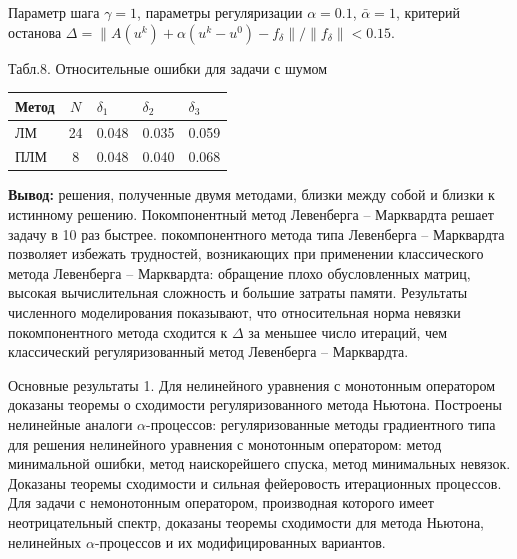 \documentclass[10pt,pdf, mathserif, hyperref={unicode}]{beamer}
\begin{document}
\begin{frame}{}
	Параметр шага $\gamma=1$, параметры регуляризации $\alpha=0.1$, $\bar{\alpha}=1$, критерий останова $\Delta=\|A(u^k)+\alpha(u^k-u^0)-f_\delta\|/\|f_\delta\|<0.15$.
	\begin{table}[H]
		\centering
		{\scriptsize Табл.8. Относительные ошибки для задачи с шумом}
		\begin{tabular}{|l|c|l|l|l|}
			\hline
			\textbf{Метод} & \textbf{$N$} & \textbf{$\delta_1$} & \textbf{$\delta_2$} & \textbf{$\delta_3$} \\ \hline
			ЛМ                                                    & 24                            & 0.048                                & 0.035                                & 0.059                                \\ \hline
			ПЛМ                                                   & 8                             & 0.048                                & 0.040                                & 0.068                                \\ \hline
		\end{tabular}
	\end{table}
	\textbf{\color{blue}Вывод:} решения, полученные двумя методами, близки между собой и близки к истинному решению. Покомпонентный метод Левенберга -- Марквардта решает задачу в 10 раз быстрее.
	покомпонентного метода типа Левенберга – Марквардта позволяет избежать трудностей, возникающих при применении классического метода Левенберга – Марквардта: обращение плохо обусловленных матриц, высокая вычислительная сложность и большие затраты памяти. Результаты численного моделирования показывают, что относительная норма невязки покомпонентного метода сходится
	к $\Delta$ за меньшее число итераций, чем классический регуляризованный метод Левенберга – Марквардта.
\end{frame}

\begin{frame}{Основные результаты}
	1. Для нелинейного уравнения с монотонным оператором доказаны теоремы о сходимости регуляризованного метода Ньютона. 
	Построены нелинейные аналоги $\alpha$-процессов:  регуляризованные методы градиентного типа для решения нелинейного уравнения с монотонным оператором: метод минимальной ошибки, метод наискорейшего спуска, метод минимальных невязок. Доказаны теоремы сходимости и сильная фейеровость итерационных процессов. Для задачи с немонотонным оператором, производная которого имеет неотрицательный спектр, доказаны теоремы сходимости для метода  Ньютона, нелинейных $\alpha$-процессов и их модифицированных вариантов.
	  
	
\end{frame}
\end{document}
